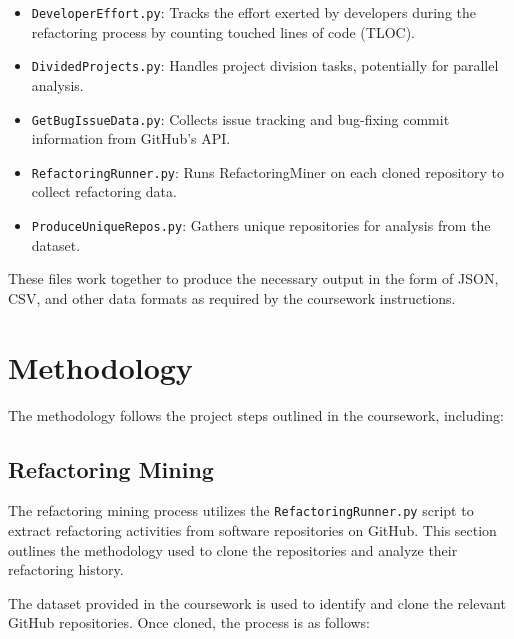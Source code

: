 \documentclass[sigconf]{acmart}
\begin{document}
\begin{itemize}
  \item \texttt{DeveloperEffort.py}: Tracks the effort exerted by developers during the refactoring process by counting touched lines of code (TLOC).
  \item \texttt{DividedProjects.py}: Handles project division tasks, potentially for parallel analysis.
  \item \texttt{GetBugIssueData.py}: Collects issue tracking and bug-fixing commit information from GitHub's API.
  \item \texttt{RefactoringRunner.py}: Runs RefactoringMiner on each cloned repository to collect refactoring data.
  \item \texttt{ProduceUniqueRepos.py}: Gathers unique repositories for analysis from the dataset.
\end{itemize}

These files work together to produce the necessary output in the form of JSON, CSV, and other data formats as required by the coursework instructions.

\section{Methodology}
The methodology follows the project steps outlined in the coursework, including:

\subsection{Refactoring Mining}
The refactoring mining process utilizes the \texttt{RefactoringRunner.py} script to extract refactoring activities from software repositories on GitHub. This section outlines the methodology used to clone the repositories and analyze their refactoring history.

The dataset provided in the coursework is used to identify and clone the relevant GitHub repositories. Once cloned, the process is as follows:
\end{document}
